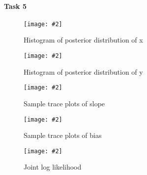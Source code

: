 \documentclass{article}
\newcommand{\centerfigcap}[3]{\begin{figure}[H]
\begin{center}\texttt{[image: \#2]} \caption{#3}\end{center}
\end{figure}}
\begin{document}
\paragraph{Task 5}

\begin{minipage}{.5\textwidth}
  \centering
\centerfigcap{1}{../figures/HMC_plt_hist_program_5_d_0}{Histogram of posterior distribution of x}
\end{minipage}%
\begin{minipage}{.5\textwidth}
  \centering
\centerfigcap{1}{../figures/HMC_plt_hist_program_5_d_1}{Histogram of posterior distribution of y}
\end{minipage}

\begin{minipage}{.5\textwidth}
  \centering
  \centerfigcap{1}{../figures/HMC_plt_trace_program_5_d_0}{Sample trace plots of slope}
\end{minipage}%
\begin{minipage}{.5\textwidth}
  \centering
  \centerfigcap{1}{../figures/HMC_plt_trace_program_5_d_1}{Sample trace plots of bias}
\end{minipage}

\centerfigcap{1}{../figures/HMC_plt_log_joint_program_5}{Joint log likelihood}
\end{document}
